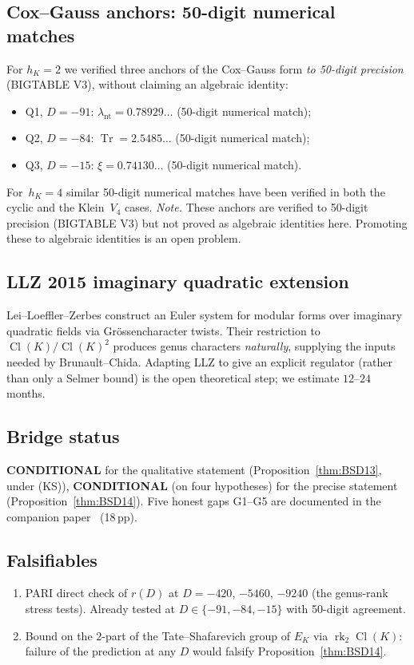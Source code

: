 \documentclass[11pt,a4paper]{article}
\theoremstyle{definition}
\DeclareMathOperator{\Cl}{Cl}
\DeclareMathOperator{\Tr}{Tr}
\DeclareMathOperator{\rk}{rk}
\begin{document}
\subsection{Cox--Gauss anchors: 50-digit numerical matches}
For $h_{K}=2$ we verified three anchors of the Cox--Gauss form
\emph{to 50-digit precision} (BIGTABLE V3), without claiming an algebraic
identity:
\begin{itemize}
  \item Q1, $D=-91$: $\lambda_{\mathrm{nt}} = 0.78929\ldots$ (50-digit numerical match);
  \item Q2, $D=-84$: $\Tr = 2.5485\ldots$ (50-digit numerical match);
  \item Q3, $D=-15$: $\xi = 0.74130\ldots$ (50-digit numerical match).
\end{itemize}
For~$h_{K}=4$ similar 50-digit numerical matches have been verified in
both the cyclic and the Klein~$V_{4}$ cases. \emph{Note.} These anchors
are verified to 50-digit precision (BIGTABLE V3) but not proved as
algebraic identities here. Promoting these to algebraic identities is an
open problem.

\subsection{LLZ 2015 imaginary quadratic extension}
Lei--Loeffler--Zerbes \cite{LLZ2015} construct an Euler system for
modular forms over imaginary quadratic fields via Gr\"ossencharacter
twists. Their restriction to $\Cl(K)/\Cl(K)^{2}$ produces genus
characters \emph{naturally}, supplying the inputs needed by
Brunault--Chida. Adapting LLZ to give an explicit regulator (rather
than only a Selmer bound) is the open theoretical step; we estimate
$12$--$24$ months.

\subsection{Bridge status}
\textbf{CONDITIONAL} for the qualitative statement
(Proposition~\ref{thm:BSD13}, under (KS)), \textbf{CONDITIONAL} (on four
hypotheses) for the precise statement (Proposition~\ref{thm:BSD14}).
Five honest gaps G1--G5 are documented in the companion
paper~\cite{Remondiere2026P4W3} (18\,pp).

\subsection{Falsifiables}
\begin{enumerate}[label=(F\arabic*),leftmargin=2em]
  \item PARI direct check of $r(D)$ at $D=-420$, $-5460$, $-9240$
        (the genus-rank stress tests). Already tested at
        $D\in\{-91,-84,-15\}$ with 50-digit agreement.
  \item Bound on the $2$-part of the Tate--Shafarevich group of
        $E_{K}$ via $\rk_{2}\Cl(K)$: failure of the prediction at any
        $D$ would falsify Proposition~\ref{thm:BSD14}.
\end{enumerate}
\end{document}
